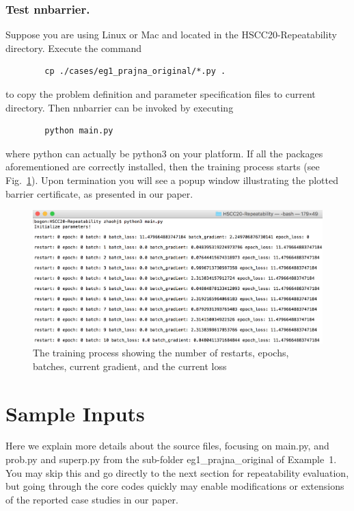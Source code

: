 \documentclass{llncs}
\begin{document}
\subsubsection{Test \textsf{nnbarrier}.} Suppose you are using Linux or Mac and located in the \textsf{HSCC20-Repeatability} directory. Execute the command
\begin{verbatim}              
        cp ./cases/eg1_prajna_original/*.py .
\end{verbatim}
to copy the problem definition and parameter specification files to current directory. Then \textsf{nnbarrier} can be invoked by executing
\begin{verbatim}              
        python main.py
\end{verbatim}
where \textsf{python} can actually be \textsf{python3} on your platform. If all the packages aforementioned are correctly 
installed, then the training process starts (see Fig.~\ref{fig:train-process}). Upon termination you will see a popup window illustrating the plotted barrier certificate,
as presented in our paper.
\begin{figure}[t]
    \includegraphics[width=\textwidth]{./fig/training-process}
    \caption{The training process showing the number of restarts, epochs, batches, current gradient, and the current loss} \label{fig:train-process}
\end{figure}

\section{Sample Inputs}
Here we explain more details about the source files, focusing on \textsf{main.py}, and \textsf{prob.py} and \textsf{superp.py} from the sub-folder
{\color{blue}\textsf{eg1\_prajna\_original}} of Example~1. You may skip this and go directly to the next
section for repeatability evaluation, but going through the core codes quickly may enable modifications or extensions of
the reported case studies in our paper.
\end{document}
